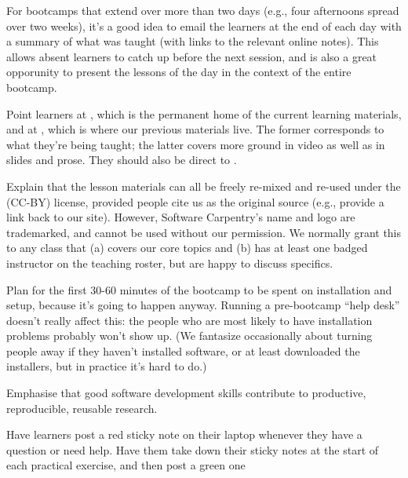 \documentclass{book}
\begin{document}
\begin{swcitemize}
\item
  For bootcamps that extend over more than two days (e.g., four
  afternoons spread over two weeks), it's a good idea to email the
  learners at the end of each day with a summary of what was taught
  (with links to the relevant online notes). This allows absent learners
  to catch up before the next session, and is also a great opporunity to
  present the lessons of the day in the context of the entire bootcamp.
\item
  Point learners at
  ,
  which is the permanent home of the current learning materials, and at
  ,
  which is where our previous materials live. The former corresponds to
  what they're being taught; the latter covers more ground in video as
  well as in slides and prose. They should also be direct to
  .
\item
  Explain that the lesson materials can all be freely re-mixed and
  re-used under the  (CC-BY) license, provided people cite us as the original
  source (e.g., provide a link back to our site). However, Software
  Carpentry's name and logo are trademarked, and cannot be used without
  our permission. We normally grant this to any class that (a) covers
  our core topics and (b) has at least one badged instructor on the
  teaching roster, but are happy to discuss specifics.
\item
  Plan for the first 30-60 minutes of the bootcamp to be spent on
  installation and setup, because it's going to happen anyway. Running a
  pre-bootcamp ``help desk'' doesn't really affect this: the people who
  are most likely to have installation problems probably won't show up.
  (We fantasize occasionally about turning people away if they haven't
  installed software, or at least downloaded the installers, but in
  practice it's hard to do.)
\item
  Emphasise that good software development skills contribute to
  productive, reproducible, reusable research.
\item
  Have learners post a red sticky note on their laptop whenever they
  have a question or need help. Have them take down their sticky notes
  at the start of each practical exercise, and then post a green one

\end{swcitemize}
\end{document}

